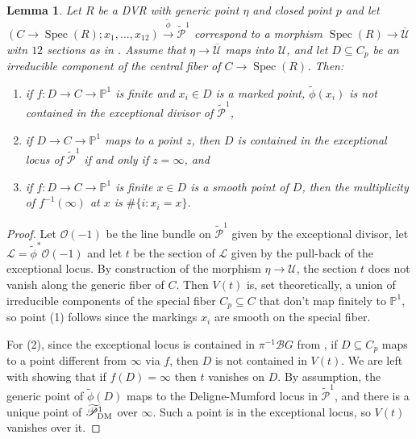 \documentclass{amsart}
\newcommand{\bP}{\mathbb{P}}
\newcommand{\sP}{\mathscr{P}}
\newcommand{\cB}{\mathcal{B}}
\newcommand{\cL}{\mathcal{L}}
\newcommand{\cO}{\mathcal{O}}
\newcommand{\cU}{\mathcal{U}}
\newcommand{\spec}{\operatorname{Spec}}
\newcommand{\dm}{{\rm DM}}
\newtheorem{Lemma}[theorem]{Lemma}
\theoremstyle{definition}
\theoremstyle{definition}
\begin{document}
{\begin{Lemma}\label{lemma_irred_cp_which_map_to_infty_map_to_exc_locus}
     Let $R$ be a DVR with generic point $\eta$ and closed point $p$ and let $(C\to \spec(R);x_1,...,x_{12})\xrightarrow{\widetilde{\phi}}\widetilde{\sP}^1$ correspond to a morphism $\spec(R)\to \overline{\cU}$ witn $12$ sections as in . Assume that $\eta\to\overline{\cU}$ maps into $\cU$, and let $D\subseteq C_p$ be an irreducible component of the central fiber of $C\to \spec(R)$. Then:
     \begin{enumerate}
         \item if $f:D\to C\to \bP^1$ is finite and $x_i\in D$ is a marked point, $\widetilde{\phi}(x_i)$ is not contained in the exceptional divisor of $\widetilde{\sP}^1$,
         \item if $D\to C\to \bP^1$ maps to a point $z$, then $D$ is contained in the exceptional locus of $\widetilde{\sP}^1$ if and only if $z=\infty$, and
         \item if $f:D\to C\to \bP^1$ is finite $x\in D$ is a smooth point of $D$, then the multiplicity of $f^{-1}(\infty)$ at $x$ is $\#\{i:x_i=x\}$.         
     \end{enumerate}
\end{Lemma}
\begin{proof}
    Let $\cO(-1)$ be the line bundle on $\widetilde{\sP}^1$ given by the exceptional divisor, let $\cL=\widetilde{\phi}^*\cO(-1)$ and let $t$ be the section of $\cL$ given by the pull-back of the exceptional locus.
    By construction of the morphism $\eta\to \cU$, the section $t$ does not vanish along the generic fiber of $C$. Then $V(t)$ is, set theoretically, a union of irreducible components of the special fiber $C_p\subseteq C$ that don't map finitely to $\bP^1$, so point (1) follows since the markings $x_i$ are smooth on the special fiber.
    
    For (2), since the exceptional locus is contained in $\pi^{-1}\cB G$ from , if $D\subseteq C_p$ maps to a point different from $\infty$ via $f$, then $D$ is not contained in $V(t)$. We are left with showing that if $f(D)=\infty$ then $t$ vanishes on $D$. By assumption, the generic point of $\widetilde{\phi}(D)$ maps to the Deligne-Mumford locus in $\widetilde{\sP}^1$, and there is a unique point of $\widetilde{\sP}^1_\dm$ over $\infty$. Such a point is in the exceptional locus, so $V(t)$ vanishes over it.


\end{proof}}
\end{document}

